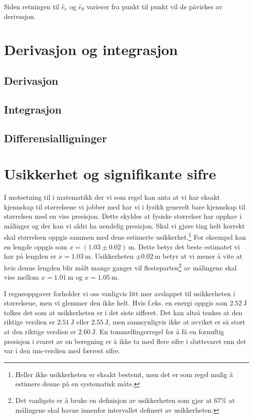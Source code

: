 \documentclass[a4paper,norsk,12pt]{book}
\def\er{\ensuremath{\hat{e}_r}}
\def\eth{\ensuremath{\hat{e}_\theta}}
\begin{document}
Siden retningen til $\er$ og $\eth$ varierer fra punkt til punkt vil de påvirkes av derivasjon. 

\chapter{Derivasjon og integrasjon}

\section{Derivasjon}
\section{Integrasjon}
\section{Differensialligninger}

\chapter{Usikkerhet og signifikante sifre}
I motsetning til i matematikk der vi som regel kan anta at vi har eksakt kjennskap til størrelsene vi jobber med har vi i fysikk generelt bare kjennskap til størrelsen med en viss presisjon. Dette skyldes at fysiske størrelser har opphav i målinger og der kan vi aldri ha uendelig presisjon. Skal vi gjøre ting helt korrekt skal størrelsen oppgis sammen med dens estimerte usikkerhet.\footnote{Heller ikke usikkerheten er eksakt bestemt, men det er som regel mulig å estimere denne på en systematisk måte.
} For eksempel kan en lengde oppgis som $x=(1.03\pm0.02)~\mathrm{m}$. Dette betyr det beste estimatet vi har på lengden er $x = 1.03~\mathrm{m}$. Usikkerheten $\pm0.02~\mathrm{m}$ betyr at vi mener å vite at hvis denne lengden blir målt mange ganger vil flesteparten\footnote{Det vanligste er å bruke en definisjon av usikkerheten som gjør at 67\% at målingene skal havne innenfor intervallet definert av usikkerheten.} av målingene skal vise mellom $x=1.01~\mathrm{m}$ og $x=1.05~\mathrm{m}$. 

I regneoppgaver forholder vi oss vanligvis litt mer avslappet til usikkerheten i størrelsene, men vi glemmer den ikke helt. Hvis f.eks. en energi oppgis som $2.52~\mathrm{J}$ tolkes det som at usikkerheten er i det siste sifferet. Det kan altså tenkes at den riktige verdien er $2.51~\mathrm{J}$ eller $2.55~\mathrm{J}$, men sannsynligvis ikke at avviket er så stort at den riktige verdien er $2.60~\mathrm{J}$. En tommelfingerregel for å få en fornuftig presisjon i svaret av en beregning er å ikke ta med flere sifre i sluttsvaret enn det var i den inn-verdien med færrest sifre.
\end{document}
